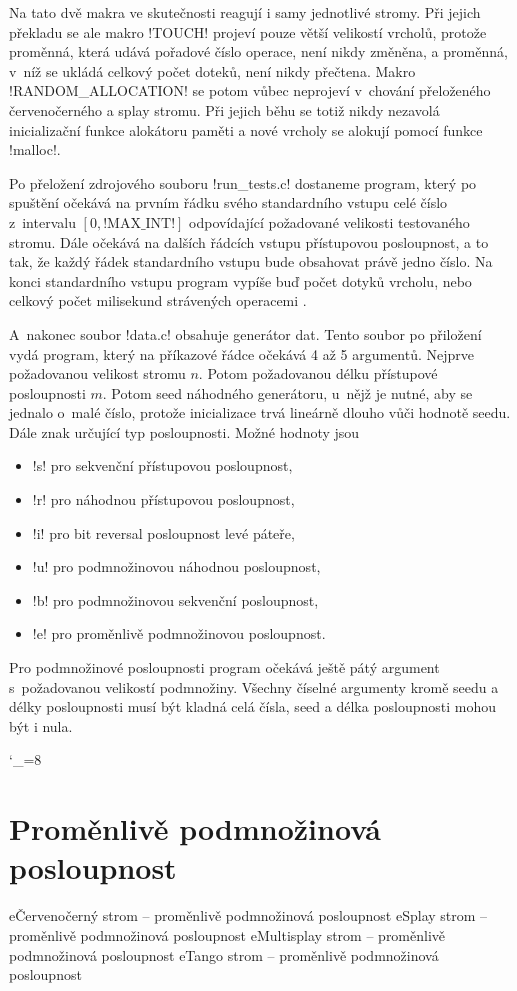 Na tato dvě makra ve skutečnosti reagují i samy jednotlivé stromy. Při jejich
překladu se ale makro !TOUCH! projeví pouze větší velikostí vrcholů, protože
proměnná, která udává pořadové číslo operace, není nikdy změněna, a proměnná,
v~níž se ukládá celkový počet doteků, není nikdy přečtena. Makro
!RANDOM_ALLOCATION! se potom vůbec neprojeví v~chování přeloženého
červenočerného a splay stromu. Při jejich běhu se totiž nikdy nezavolá
inicializační funkce alokátoru paměti a nové vrcholy se alokují pomocí funkce
!malloc!.

Po přeložení zdrojového souboru !run_tests.c! dostaneme program, který po
spuštění očekává na prvním řádku svého standardního vstupu celé číslo
z~intervalu $[0, \text{!MAX_INT!}]$ odpovídající požadované velikosti testovaného stromu. Dále
očekává na dalších řádcích vstupu přístupovou posloupnost, a to tak, že každý
řádek standardního vstupu bude obsahovat právě jedno číslo. Na konci
standardního vstupu program vypíše buď počet dotyků vrcholu, nebo celkový
počet milisekund strávených operacemi .

A~nakonec soubor !data.c! obsahuje generátor dat. Tento soubor po přiložení vydá program, který na příkazové řádce očekává 4 až 5 argumentů. Nejprve požadovanou velikost stromu $n$. Potom požadovanou délku přístupové posloupnosti $m$. Potom seed náhodného generátoru, u~nějž je nutné, aby se jednalo o~malé číslo, protože inicializace trvá lineárně dlouho vůči hodnotě seedu. Dále znak určující typ posloupnosti. Možné hodnoty jsou

\begin{itemize}
\item !s! pro sekvenční přístupovou posloupnost,
\item !r! pro náhodnou přístupovou posloupnost,
\item !i! pro bit reversal posloupnost levé páteře,
\item !u! pro podmnožinovou náhodnou posloupnost,
\item !b! pro podmnožinovou sekvenční posloupnost,
\item !e! pro proměnlivě podmnožinovou posloupnost.
\end{itemize}

Pro podmnožinové posloupnosti program očekává ještě pátý argument s~požadovanou velikostí podmnožiny. Všechny číselné argumenty kromě seedu a délky posloupnosti musí být kladná celá čísla, seed a délka posloupnosti mohou být i nula.

\catcode`_=8

\openright
\section{Proměnlivě podmnožinová posloupnost}\label{sec:app2}

e{Červenočerný strom -- proměnlivě podmnožinová posloupnost}
e{Splay strom -- proměnlivě podmnožinová posloupnost}
e{Multisplay strom -- proměnlivě podmnožinová posloupnost}
e{Tango strom -- proměnlivě podmnožinová posloupnost}

